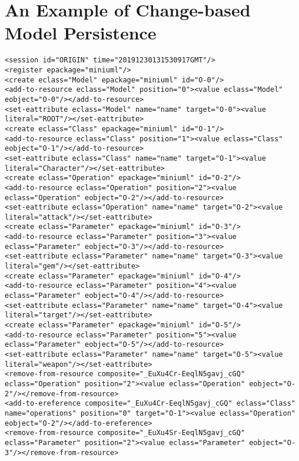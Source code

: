 \chapter{An Example of Change-based Model Persistence}
\label{sec:examples_of_cbp}

\vspace{-20pt}
\begin{lstlisting}[style=cbpfile,caption={Change-based representation of the model in Figure \ref{fig:class_diagram_left}.},label=lst:class_diagram_left_cbpfile]
<session id="ORIGIN" time="20191230131530917GMT"/>
<register epackage="miniuml"/>
<create eclass="Model" epackage="miniuml" id="O-0"/>
<add-to-resource eclass="Model" position="0"><value eclass="Model" eobject="O-0"/></add-to-resource>
<set-eattribute eclass="Model" name="name" target="O-0"><value literal="ROOT"/></set-eattribute>
<create eclass="Class" epackage="miniuml" id="O-1"/>
<add-to-resource eclass="Class" position="1"><value eclass="Class" eobject="O-1"/></add-to-resource>
<set-eattribute eclass="Class" name="name" target="O-1"><value literal="Character"/></set-eattribute>
<create eclass="Operation" epackage="miniuml" id="O-2"/>
<add-to-resource eclass="Operation" position="2"><value eclass="Operation" eobject="O-2"/></add-to-resource>
<set-eattribute eclass="Operation" name="name" target="O-2"><value literal="attack"/></set-eattribute>
<create eclass="Parameter" epackage="miniuml" id="O-3"/>
<add-to-resource eclass="Parameter" position="3"><value eclass="Parameter" eobject="O-3"/></add-to-resource>
<set-eattribute eclass="Parameter" name="name" target="O-3"><value literal="gem"/></set-eattribute>
<create eclass="Parameter" epackage="miniuml" id="O-4"/>
<add-to-resource eclass="Parameter" position="4"><value eclass="Parameter" eobject="O-4"/></add-to-resource>
<set-eattribute eclass="Parameter" name="name" target="O-4"><value literal="target"/></set-eattribute>
<create eclass="Parameter" epackage="miniuml" id="O-5"/>
<add-to-resource eclass="Parameter" position="5"><value eclass="Parameter" eobject="O-5"/></add-to-resource>
<set-eattribute eclass="Parameter" name="name" target="O-5"><value literal="weapon"/></set-eattribute>
<remove-from-resource composite="_EuXu4Cr-EeqlN5gavj_cGQ" eclass="Operation" position="2"><value eclass="Operation" eobject="O-2"/></remove-from-resource>
<add-to-ereference composite="_EuXu4Cr-EeqlN5gavj_cGQ" eclass="Class" name="operations" position="0" target="O-1"><value eclass="Operation" eobject="O-2"/></add-to-ereference>
<remove-from-resource composite="_EuXu4Sr-EeqlN5gavj_cGQ" eclass="Parameter" position="2"><value eclass="Parameter" eobject="O-3"/></remove-from-resource>

\end{lstlisting}
